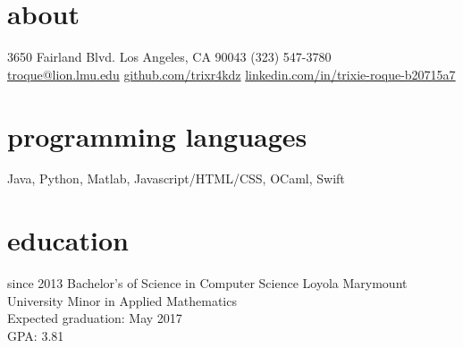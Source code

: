 \documentclass[]{friggeri-cv} %
\begin{document}


\begin{aside} %
  \section{about}
    3650 Fairland Blvd.
    Los Angeles, CA 90043
    (323) 547-3780
    ~
    \href{mailto:troque@lion.lmu.edu}{troque@lion.lmu.edu}
    \href{http://github.com/trixr4kdz}{github.com/trixr4kdz}
    \href{http://linkedin.com/in/trixie-roque-b20715a7}{linkedin.com/in/trixie-roque-b20715a7}
  \section{programming languages}
    Java, Python, Matlab, Javascript/HTML/CSS, OCaml, Swift
\end{aside}


\section{education}

  \begin{entrylist}


    \entry
      {since 2013}
      {Bachelor's of Science {\normalfont in Computer Science}}
      {Loyola Marymount University}
      {Minor {\normalfont in Applied Mathematics} \\ 
      Expected graduation: May 2017 \\
      GPA: 3.81}


\end{entrylist}

\end{document}

